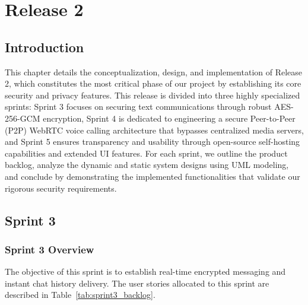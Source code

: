 
\chapter{Release 2}
\label{ch:chapter4}

\section{Introduction}
This chapter details the conceptualization, design, and implementation of Release 2, which constitutes the most critical phase of our project by establishing its core security and privacy features. This release is divided into three highly specialized sprints: Sprint 3 focuses on securing text communications through robust AES-256-GCM encryption, Sprint 4 is dedicated to engineering a secure Peer-to-Peer (P2P) WebRTC voice calling architecture that bypasses centralized media servers, and Sprint 5 ensures transparency and usability through open-source self-hosting capabilities and extended UI features. For each sprint, we outline the product backlog, analyze the dynamic and static system designs using UML modeling, and conclude by demonstrating the implemented functionalities that validate our rigorous security requirements.

\section{Sprint 3}

\subsection{Sprint 3 Overview}
The objective of this sprint is to establish real-time encrypted messaging and instant chat history delivery. The user stories allocated to this sprint are described in Table~\ref{tab:sprint3_backlog}.


